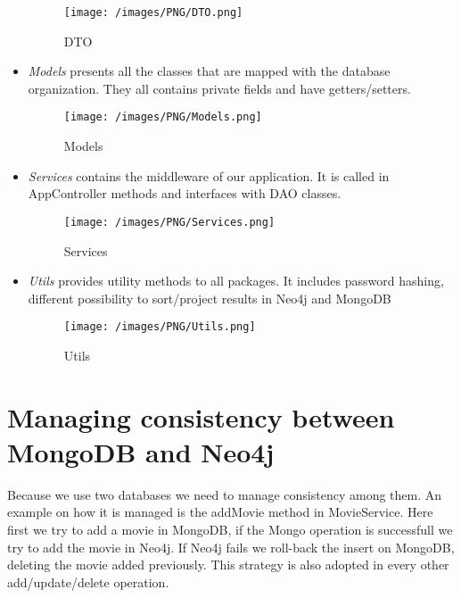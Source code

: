 \begin{itemize}
	\begin{figure}[H]
	\begin{center}
	\texttt{[image: /images/PNG/DTO.png]}
	\caption{DTO}
	\end{center}
	\end{figure}
	\item \emph{Models} presents all the classes that are mapped with the database organization. They all contains private fields and have getters/setters. 
	 \begin{figure}[H]
	\begin{center}
	\texttt{[image: /images/PNG/Models.png]}
	\caption{Models}
	\end{center}
	\end{figure}
	\item \emph{Services} contains the middleware of our application. It is called in AppController methods and interfaces with DAO classes.
	 \begin{figure}[H]
	\begin{center}
	\texttt{[image: /images/PNG/Services.png]}
	\caption{Services}
	\end{center}
	\end{figure}
	\item \emph{Utils} provides utility methods to all packages. It includes password hashing, different possibility to sort/project results in Neo4j and MongoDB
	 \begin{figure}[H]
	\begin{center}
	\texttt{[image: /images/PNG/Utils.png]}
	\caption{Utils}
	\end{center}
	\end{figure}
\end{itemize}

\section{Managing consistency between MongoDB and Neo4j}
Because we use two databases we need to manage consistency among them. An example on how it is managed is the addMovie method in MovieService. Here first we try to add a movie in MongoDB, if the Mongo operation is successfull we try to add the movie in Neo4j. If Neo4j fails we roll-back the insert on MongoDB, deleting the movie added previously. This strategy is also adopted in every other add/update/delete operation.
